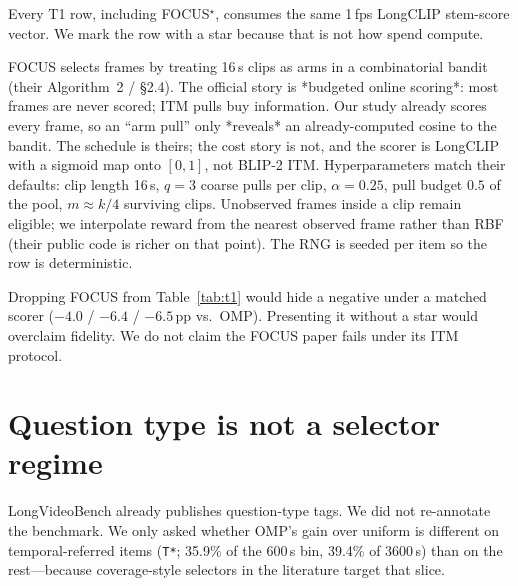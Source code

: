 \documentclass[11pt]{article}
\begin{document}
Every T1 row, including FOCUS$^\star$, consumes the same 1\,fps LongCLIP stem-score vector.
We mark the row with a star because that is not how \citet{zhu2025focus} spend compute.

FOCUS selects frames by treating 16\,s clips as arms in a combinatorial bandit (their Algorithm~2 / \S2.4).
The official story is *budgeted online scoring*: most frames are never scored; ITM pulls buy information.
Our study already scores every frame, so an ``arm pull'' only *reveals* an already-computed cosine to the bandit.
The schedule is theirs; the cost story is not, and the scorer is LongCLIP with a sigmoid map onto $[0,1]$, not BLIP-2 ITM.
Hyperparameters match their defaults: clip length 16\,s, $q{=}3$ coarse pulls per clip, $\alpha{=}0.25$, pull budget $0.5$ of the pool, $m{\approx}k/4$ surviving clips.
Unobserved frames inside a clip remain eligible; we interpolate reward from the nearest observed frame rather than RBF (their public code is richer on that point).
The RNG is seeded per item so the row is deterministic.

Dropping FOCUS from Table~\ref{tab:t1} would hide a negative under a matched scorer (${-}4.0$ / ${-}6.4$ / ${-}6.5$\,pp vs.\ OMP).
Presenting it without a star would overclaim fidelity.
We do not claim the FOCUS paper fails under its ITM protocol.

\section{Question type is not a selector regime}
\label{app:qtype}

LongVideoBench already publishes question-type tags.
We did not re-annotate the benchmark.
We only asked whether OMP's gain over uniform is different on temporal-referred items (\texttt{T*}; 35.9\% of the 600\,s bin, 39.4\% of 3600\,s) than on the rest---because coverage-style selectors in the literature target that slice.

\begin{table}[h]
\centering
\small
{}
\caption{OMP vs.\ uniform on official LongVideoBench tags. Reading 600\,s alone suggests temporal questions are unwinnable; 3600\,s reverses. The interaction test is ns in both long bins.}
\label{tab:qtype}
\end{table}
\end{document}
